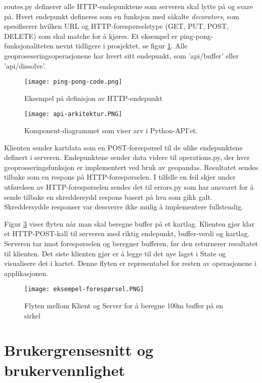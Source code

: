 routes.py definerer alle HTTP-endepunktene som serveren skal lytte på og svare på. Hvert endepunkt defineres som en funksjon med såkalte \textit{decorators}, som spesifiserer hvilken URL og HTTP-forespørselstype (GET, PUT, POST, DELETE) som skal matche for å kjøres. Et eksempel er ping-pong-funksjonaliteten nevnt tidligere i prosjektet, se figur \ref{fig:ping-pong}. Alle geoproseseringsoperasjonene har hvert sitt endepunkt, som 'api/buffer' eller 'api/dissolve'.

\begin{figure}[h]
    \center
    \texttt{[image: ping-pong-code.png]}
    \caption{Eksempel på definisjon av HTTP-endepunkt}
    \label{fig:ping-pong}
\end{figure}



\begin{figure}[h]
    \center
    \texttt{[image: api-arkitektur.PNG]}
    \caption{Komponent-diagrammet som viser arv i Python-API'et.}
    \label{fig:api-arktitektur}
\end{figure}

Klienten sender kartdata som en POST-forespørsel til de ulike endepunktene definert i serveren. Endepunktene sender data videre til operations.py, der hver geoprosseringsfunksjon er implementert ved bruk av geopandas. Resultatet sendes tilbake som en respons på HTTP-forespørselen. I tilfelle en feil skjer under utførelsen av HTTP-forespørselen sendes det til errors.py som har ansvaret for å sende tilbake en skreddersydd respons basert på hva som gikk galt. Skreddersydde responser var dessverre ikke mulig å implementere fullstendig. 

Figur \ref{fig:forespørsel} viser flyten når man skal beregne buffer på et kartlag. Klienten gjør klar et HTTP-POST-kall til serveren med riktig endepunkt, buffer-verdi og kartlag. Serveren tar imot forespørselen og beregner bufferen, før den returnerer resultatet til klienten. Det siste klienten gjør er å legge til det nye laget i State og visualisere det i kartet. Denne flyten er representabel for resten av operasjonene i applikasjonen.  

\begin{figure}[h]
    \center
    \texttt{[image: eksempel-forespørsel.PNG]}
    \caption{Flyten mellom Klient og Server for å beregne 100m buffer på en sirkel}
    \label{fig:forespørsel}
\end{figure}

\section{Brukergrensesnitt og brukervennlighet}

